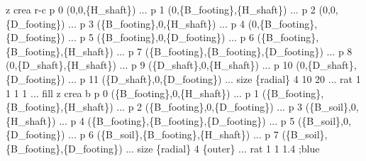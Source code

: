 \documentclass[a4paper, nobind]{templates/ociamthesis}
\newenvironment{Shaded}{\begin{snugshade}}{\end{snugshade}}
\newcommand{\SpecialCharTok}[1]{\textcolor[rgb]{0.00,0.00,0.00}{#1}}
\newcommand{\StringTok}[1]{\textcolor[rgb]{0.31,0.60,0.02}{#1}}
\renewenvironment{Shaded}
{
  \vspace{10pt}%
  \begin{snugshade}%
}{%
  \end{snugshade}%
  \vspace{8pt}%
}
\begin{document}
\begin{Shaded}
\begin{Highlighting}[]
\StringTok{z crea r{-}c p 0 (0,0,}\SpecialCharTok{\{H\_shaft\}}\StringTok{) ...}
\StringTok{           p 1 (0,}\SpecialCharTok{\{B\_footing\}}\StringTok{,}\SpecialCharTok{\{H\_shaft\}}\StringTok{) ...}
\StringTok{           p 2 (0,0,}\SpecialCharTok{\{D\_footing\}}\StringTok{) ...}
\StringTok{           p 3 (}\SpecialCharTok{\{B\_footing\}}\StringTok{,0,}\SpecialCharTok{\{H\_shaft\}}\StringTok{) ...}
\StringTok{           p 4 (0,}\SpecialCharTok{\{B\_footing\}}\StringTok{,}\SpecialCharTok{\{D\_footing\}}\StringTok{) ...}
\StringTok{           p 5 (}\SpecialCharTok{\{B\_footing\}}\StringTok{,0,}\SpecialCharTok{\{D\_footing\}}\StringTok{) ...}
\StringTok{           p 6 (}\SpecialCharTok{\{B\_footing\}}\StringTok{,}\SpecialCharTok{\{B\_footing\}}\StringTok{,}\SpecialCharTok{\{H\_shaft\}}\StringTok{) ...}
\StringTok{           p 7 (}\SpecialCharTok{\{B\_footing\}}\StringTok{,}\SpecialCharTok{\{B\_footing\}}\StringTok{,}\SpecialCharTok{\{D\_footing\}}\StringTok{) ...}
\StringTok{           p 8 (0,}\SpecialCharTok{\{D\_shaft\}}\StringTok{,}\SpecialCharTok{\{H\_shaft\}}\StringTok{) ...}
\StringTok{           p 9 (}\SpecialCharTok{\{D\_shaft\}}\StringTok{,0,}\SpecialCharTok{\{H\_shaft\}}\StringTok{) ...}
\StringTok{           p 10 (0,}\SpecialCharTok{\{D\_shaft\}}\StringTok{,}\SpecialCharTok{\{D\_footing\}}\StringTok{) ...}
\StringTok{           p 11 (}\SpecialCharTok{\{D\_shaft\}}\StringTok{,0,}\SpecialCharTok{\{D\_footing\}}\StringTok{) ...}
\StringTok{           size }\SpecialCharTok{\{radial\}}\StringTok{ 4 10 20 ...}
\StringTok{           rat 1 1 1 1 ...}
\StringTok{           fill}
\StringTok{           }
\StringTok{z crea b p 0 (}\SpecialCharTok{\{B\_footing\}}\StringTok{,0,}\SpecialCharTok{\{H\_shaft\}}\StringTok{) ...}
\StringTok{         p 1 (}\SpecialCharTok{\{B\_footing\}}\StringTok{,}\SpecialCharTok{\{B\_footing\}}\StringTok{,}\SpecialCharTok{\{H\_shaft\}}\StringTok{) ...}
\StringTok{         p 2 (}\SpecialCharTok{\{B\_footing\}}\StringTok{,0,}\SpecialCharTok{\{D\_footing\}}\StringTok{) ...}
\StringTok{         p 3 (}\SpecialCharTok{\{B\_soil\}}\StringTok{,0,}\SpecialCharTok{\{H\_shaft\}}\StringTok{) ...}
\StringTok{         p 4 (}\SpecialCharTok{\{B\_footing\}}\StringTok{,}\SpecialCharTok{\{B\_footing\}}\StringTok{,}\SpecialCharTok{\{D\_footing\}}\StringTok{) ...}
\StringTok{         p 5 (}\SpecialCharTok{\{B\_soil\}}\StringTok{,0,}\SpecialCharTok{\{D\_footing\}}\StringTok{) ...}
\StringTok{         p 6 (}\SpecialCharTok{\{B\_soil\}}\StringTok{,}\SpecialCharTok{\{B\_footing\}}\StringTok{,}\SpecialCharTok{\{H\_shaft\}}\StringTok{) ...}
\StringTok{         p 7 (}\SpecialCharTok{\{B\_soil\}}\StringTok{,}\SpecialCharTok{\{B\_footing\}}\StringTok{,}\SpecialCharTok{\{D\_footing\}}\StringTok{) ...}
\StringTok{         size }\SpecialCharTok{\{radial\}}\StringTok{ 4 }\SpecialCharTok{\{outer\}}\StringTok{ ...}
\StringTok{         rat 1 1 1.4 ;blue}


\end{Highlighting}
\end{Shaded}
\end{document}
